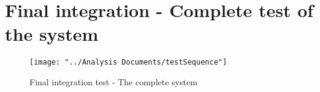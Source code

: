 \section{Final integration - Complete test of the system}

\begin{figure}[H]
	\centering
	\texttt{[image: "../Analysis Documents/testSequence"]}
	\caption{Final integration test - The complete system}
	\label{fig:Ifinal}
\end{figure}
